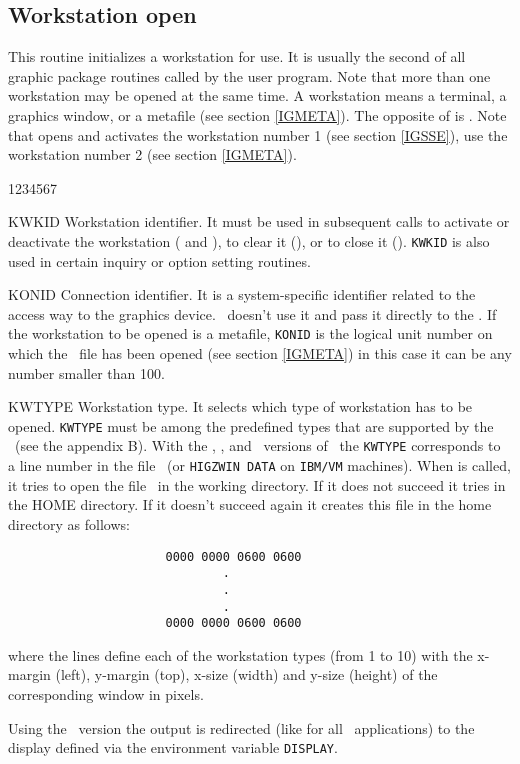 \subsection{Workstation open}
\Action
This routine initializes a workstation for use. It is usually the second
of all graphic package routines called by the user program.
Note that more than one workstation may be opened at the same time. A
workstation means a terminal, a graphics window, or a metafile (see section
\ref{IGMETA}). The opposite of  is . Note that
 opens and activates the workstation number 1 (see section
\ref{IGSSE}),  use the workstation number 2 (see section
\ref{IGMETA}).
\Pdesc
\begin{DLtt}{1234567}
\item[KWKID] Workstation identifier. It must be used in subsequent calls
             to activate or deactivate the workstation ( and
	     ), to clear it (), or to close it
	     (). {\tt KWKID} is also used in certain inquiry or
	     option setting routines.
\item[KONID] Connection identifier. It is a system-specific identifier related
             to the access way to the graphics device. \HIGZ~doesn't use it
             and pass it directly to the \UGP. If the workstation to be
             opened is a metafile, {\tt KONID} is the logical unit number
             on which the \FORTRAN~file has been opened (see section
             \ref{IGMETA}) in this case it can be any number smaller than 100.
\item[KWTYPE] Workstation type. It selects which type of workstation has to be
              opened. {\tt KWTYPE} must be among the predefined types that are
              supported by the \UGP~(see the appendix B). With the , \GPR,
	      and \GL~versions of \HIGZ~the {\tt KWTYPE} corresponds to a line
	      number in the file \HW~(or {\tt HIGZWIN DATA} on {\tt IBM/VM}
	      machines). When  is called, it tries to open the file
	      \HW~in the working directory. If it does not succeed it tries in
	      the HOME directory. If it doesn't succeed again it creates this
	      file in the home directory as follows:
\begin{verbatim}
                      0000 0000 0600 0600
                              .
                              .
                              .
                      0000 0000 0600 0600
\end{verbatim}
where the lines define each of the workstation types (from 1 to 10) with
the x-margin (left), y-margin (top), x-size (width) and y-size (height) of the
corresponding window in pixels.

Using the ~version the output is redirected (like for all ~applications)
to the display defined via the environment variable {\tt DISPLAY}.
\end{DLtt}
%
